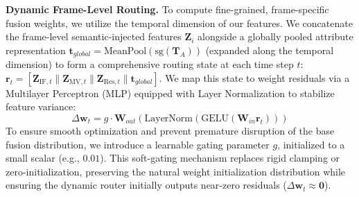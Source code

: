 \documentclass[runningheads]{llncs}
\begin{document}
\noindent\textbf{Dynamic Frame-Level Routing.} 
To compute fine-grained, frame-specific fusion weights, we utilize the temporal dimension of our features. We concatenate the frame-level semantic-injected features $\mathbf{Z}_i$ alongside a globally pooled attribute representation $\mathbf{t}_{global} = \text{MeanPool}(\text{sg}(\mathbf{T}_A))$ (expanded along the temporal dimension) to form a comprehensive routing state at each time step $t$: $\mathbf{r}_t = [\mathbf{Z}_{\text{IF}, t} \parallel \mathbf{Z}_{\text{MV}, t} \parallel \mathbf{Z}_{\text{Res}, t} \parallel \mathbf{t}_{global}]$. We map this state to weight residuals via a Multilayer Perceptron (MLP) equipped with Layer Normalization to stabilize feature variance:
$$\Delta \mathbf{w}_t = g \cdot \mathbf{W}_{out} (\text{LayerNorm}(\text{GELU}(\mathbf{W}_{in}\mathbf{r}_t)))$$
To ensure smooth optimization and prevent premature disruption of the base fusion distribution, we introduce a learnable gating parameter $g$, initialized to a small scalar (e.g., $0.01$). This soft-gating mechanism replaces rigid clamping or zero-initialization, preserving the natural weight initialization distribution while ensuring the dynamic router initially outputs near-zero residuals ($\Delta \mathbf{w}_t \approx \mathbf{0}$).
\end{document}
